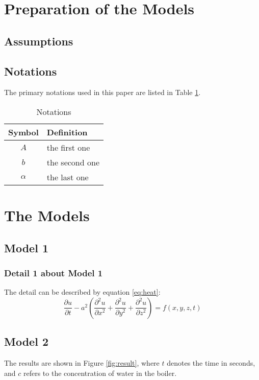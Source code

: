 \documentclass[12pt]{article}  %
\begin{document}
\section{Preparation of the Models}
\subsection{Assumptions}

\subsection{Notations}
The primary notations used in this paper are listed in Table \ref{tb:notation}.
\begin{table}[!htbp]
\begin{center}
\caption{Notations}
\begin{tabular}{cl}
	\toprule
	\multicolumn{1}{m{3cm}}{\centering Symbol}
	&\multicolumn{1}{m{8cm}}{\centering Definition}\\
	\midrule
	$A$&the first one\\
	$b$&the second one\\
	$\alpha$ &the last one\\
	\bottomrule
\end{tabular}\label{tb:notation}
\end{center}
\end{table}

\section{The Models}
\subsection{Model 1}
\subsubsection{Detail 1 about Model 1}
The detail can be described by equation \eqref{eq:heat}:
\begin{equation}\label{eq:heat}
\frac{\partial u}{\partial t} - a^2 \left( \frac{\partial^2 u}{\partial x^2} + \frac{\partial^2 u}{\partial y^2} + \frac{\partial^2 u}{\partial z^2} \right) = f(x, y, z, t)
\end{equation}

\subsection{Model 2}
The results are shown in Figure \ref{fig:result}, where $t$ denotes the time in seconds, and $c$ refers to the concentration of water in the boiler.
\end{document}
